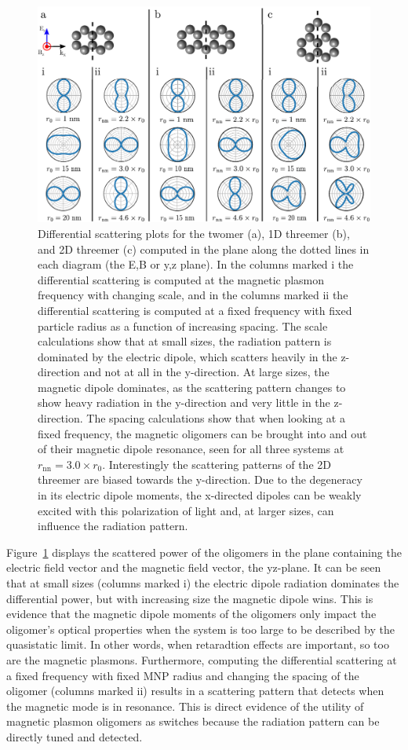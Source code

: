 \documentclass[12pt, letterpaper, twoside]{report}
\begin{document}
\begin{figure}
\centering
\includegraphics[width=6in]{polar_plots_yz.pdf}
\caption{Differential scattering plots for the twomer (a), 1D threemer (b), and 2D threemer (c) computed in the plane along the dotted lines in each diagram (the E,B or y,z plane). In the columns marked i the differential scattering is computed at the magnetic plasmon frequency with changing scale, and in the columns marked ii the differential scattering is computed at a fixed frequency with fixed particle radius as a function of increasing spacing. The scale calculations show that at small sizes, the radiation pattern is dominated by the electric dipole, which scatters heavily in the z-direction and not at all in the y-direction. At large sizes, the magnetic dipole dominates, as the scattering pattern changes to show heavy radiation in the y-direction and very little in the z-direction. The spacing calculations show that when looking at a fixed frequency, the magnetic oligomers can be brought into and out of their magnetic dipole resonance, seen for all three systems at $r_{\textrm{nn}}=3.0\times r_0$. Interestingly the scattering patterns of the 2D threemer are biased towards the y-direction. Due to the degeneracy in its electric dipole moments, the x-directed dipoles can be weakly excited with this polarization of light and, at larger sizes, can influence the radiation pattern.}
\label{polar_plots_yz}
\end{figure}

Figure~\ref{polar_plots_yz} displays the scattered power of the oligomers in the plane containing the electric field vector and the magnetic field vector, the yz-plane. It can be seen that at small sizes (columns marked i) the electric dipole radiation dominates the differential power, but with increasing size the magnetic dipole wins. This is evidence that the magnetic dipole moments of the oligomers only impact the oligomer's optical properties when the system is too large to be described by the quasistatic limit. In other words, when retaradtion effects are important, so too are the magnetic plasmons. Furthermore, computing the differential scattering at a fixed frequency with fixed MNP radius and changing the spacing of the oligomer (columns marked ii) results in a scattering pattern that detects when the magnetic mode is in resonance. This is direct evidence of the utility of magnetic plasmon oligomers as switches because the radiation pattern can be directly tuned and detected.
\end{document}
